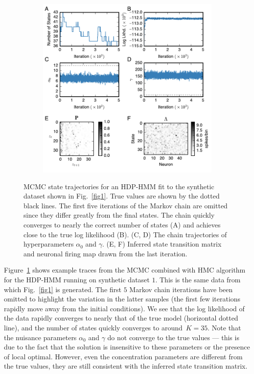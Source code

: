  
\begin{figure}[t!]
  \centering
  \begin{subfigure}[t]{5in}
    \includegraphics[width=\textwidth]{figures/ch7/Fig2.pdf}
  \end{subfigure}
  \caption[Inference results for an HDP-HMM fit to synthetic
    data]{MCMC state trajectories for an HDP-HMM fit to the synthetic
    dataset shown in Fig.~\ref{fig1}. True values are shown by the
    dotted black lines. The first five iterations of the Markov chain
    are omitted since they differ greatly from the final states. The
    chain quickly converges to nearly the correct number of states (A)
    and achieves close to the true log likelihood (B). (C, D) The
    chain trajectories of hyperparameters $\alpha_0$ and $\gamma$. (E,
    F) Inferred state transition matrix and neuronal firing map drawn
    from the last iteration.  }
  \label{fig2}
\end{figure}

Figure~\ref{fig2} shows example traces from the MCMC combined with HMC
algorithm for the HDP-HMM running on synthetic dataset $1$. This is the
same data from which Fig.~\ref{fig1} is generated. The first $5$ Markov
chain iterations have been omitted to highlight the variation in the
latter samples (the first few iterations rapidly move away from the
initial conditions). We see that the log likelihood of the data
rapidly converges to nearly that of the true model (horizontal dotted
line), and the number of states quickly converges to around~$K=35$.
Note that the nuisance parameters $\alpha_0$ and $\gamma$ do not
converge to the true values --- this is due to the fact that the
solution is insensitive to these parameters or the presence of local
optimal.  However, even the concentration parameters are different from
the true values, they are still consistent with the inferred state
transition matrix.

